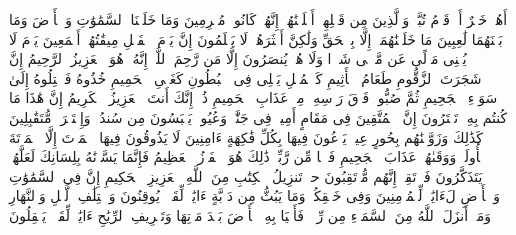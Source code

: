 \startbuffer[\q:44:37]
أَهُمۡ خَیۡرٌ أَمۡ قَوۡمُ تُبَّعࣲ وَٱلَّذِینَ مِن قَبۡلِهِمۡ أَهۡلَكۡنَٰهُمۡۚ إِنَّهُمۡ كَانُوا۟ مُجۡرِمِینَ%
\stopbuffer%
\startbuffer[\q:44:38]
وَمَا خَلَقۡنَا ٱلسَّمَٰوَٰتِ وَٱلۡأَرۡضَ وَمَا بَیۡنَهُمَا لَٰعِبِینَ%
\stopbuffer%
\startbuffer[\q:44:39]
مَا خَلَقۡنَٰهُمَاۤ إِلَّا بِٱلۡحَقِّ وَلَٰكِنَّ أَكۡثَرَهُمۡ لَا یَعۡلَمُونَ%
\stopbuffer%
\startbuffer[\q:44:40]
إِنَّ یَوۡمَ ٱلۡفَصۡلِ مِیقَٰتُهُمۡ أَجۡمَعِینَ%
\stopbuffer%
\startbuffer[\q:44:41]
یَوۡمَ لَا یُغۡنِی مَوۡلًى عَن مَّوۡلࣰى شَیۡءࣰا وَلَا هُمۡ یُنصَرُونَ%
\stopbuffer%
\startbuffer[\q:44:42]
إِلَّا مَن رَّحِمَ ٱللَّهُۚ إِنَّهُۥ هُوَ ٱلۡعَزِیزُ ٱلرَّحِیمُ%
\stopbuffer%
\startbuffer[\q:44:43]
إِنَّ شَجَرَتَ ٱلزَّقُّومِ%
\stopbuffer%
\startbuffer[\q:44:44]
طَعَامُ ٱلۡأَثِیمِ%
\stopbuffer%
\startbuffer[\q:44:45]
كَٱلۡمُهۡلِ یَغۡلِی فِی ٱلۡبُطُونِ%
\stopbuffer%
\startbuffer[\q:44:46]
كَغَلۡیِ ٱلۡحَمِیمِ%
\stopbuffer%
\startbuffer[\q:44:47]
خُذُوهُ فَٱعۡتِلُوهُ إِلَىٰ سَوَاۤءِ ٱلۡجَحِیمِ%
\stopbuffer%
\startbuffer[\q:44:48]
ثُمَّ صُبُّوا۟ فَوۡقَ رَأۡسِهِۦ مِنۡ عَذَابِ ٱلۡحَمِیمِ%
\stopbuffer%
\startbuffer[\q:44:49]
ذُقۡ إِنَّكَ أَنتَ ٱلۡعَزِیزُ ٱلۡكَرِیمُ%
\stopbuffer%
\startbuffer[\q:44:50]
إِنَّ هَٰذَا مَا كُنتُم بِهِۦ تَمۡتَرُونَ%
\stopbuffer%
\startbuffer[\q:44:51]
إِنَّ ٱلۡمُتَّقِینَ فِی مَقَامٍ أَمِینࣲ%
\stopbuffer%
\startbuffer[\q:44:52]
فِی جَنَّٰتࣲ وَعُیُونࣲ%
\stopbuffer%
\startbuffer[\q:44:53]
یَلۡبَسُونَ مِن سُندُسࣲ وَإِسۡتَبۡرَقࣲ مُّتَقَٰبِلِینَ%
\stopbuffer%
\startbuffer[\q:44:54]
كَذَٰلِكَ وَزَوَّجۡنَٰهُم بِحُورٍ عِینࣲ%
\stopbuffer%
\startbuffer[\q:44:55]
یَدۡعُونَ فِیهَا بِكُلِّ فَٰكِهَةٍ ءَامِنِینَ%
\stopbuffer%
\startbuffer[\q:44:56]
لَا یَذُوقُونَ فِیهَا ٱلۡمَوۡتَ إِلَّا ٱلۡمَوۡتَةَ ٱلۡأُولَىٰۖ وَوَقَىٰهُمۡ عَذَابَ ٱلۡجَحِیمِ%
\stopbuffer%
\startbuffer[\q:44:57]
فَضۡلࣰا مِّن رَّبِّكَۚ ذَٰلِكَ هُوَ ٱلۡفَوۡزُ ٱلۡعَظِیمُ%
\stopbuffer%
\startbuffer[\q:44:58]
فَإِنَّمَا یَسَّرۡنَٰهُ بِلِسَانِكَ لَعَلَّهُمۡ یَتَذَكَّرُونَ%
\stopbuffer%
\startbuffer[\q:44:59]
فَٱرۡتَقِبۡ إِنَّهُم مُّرۡتَقِبُونَ%
\stopbuffer%
\startbuffer[\q:45:1]
حمۤ%
\stopbuffer%
\startbuffer[\q:45:2]
تَنزِیلُ ٱلۡكِتَٰبِ مِنَ ٱللَّهِ ٱلۡعَزِیزِ ٱلۡحَكِیمِ%
\stopbuffer%
\startbuffer[\q:45:3]
إِنَّ فِی ٱلسَّمَٰوَٰتِ وَٱلۡأَرۡضِ لَءَایَٰتࣲ لِّلۡمُؤۡمِنِینَ%
\stopbuffer%
\startbuffer[\q:45:4]
وَفِی خَلۡقِكُمۡ وَمَا یَبُثُّ مِن دَاۤبَّةٍ ءَایَٰتࣱ لِّقَوۡمࣲ یُوقِنُونَ%
\stopbuffer%
\startbuffer[\q:45:5]
وَٱخۡتِلَٰفِ ٱلَّیۡلِ وَٱلنَّهَارِ وَمَاۤ أَنزَلَ ٱللَّهُ مِنَ ٱلسَّمَاۤءِ مِن رِّزۡقࣲ فَأَحۡیَا بِهِ ٱلۡأَرۡضَ بَعۡدَ مَوۡتِهَا وَتَصۡرِیفِ ٱلرِّیَٰحِ ءَایَٰتࣱ لِّقَوۡمࣲ یَعۡقِلُونَ%
\stopbuffer%
\startbuffer[\q:45:6]
